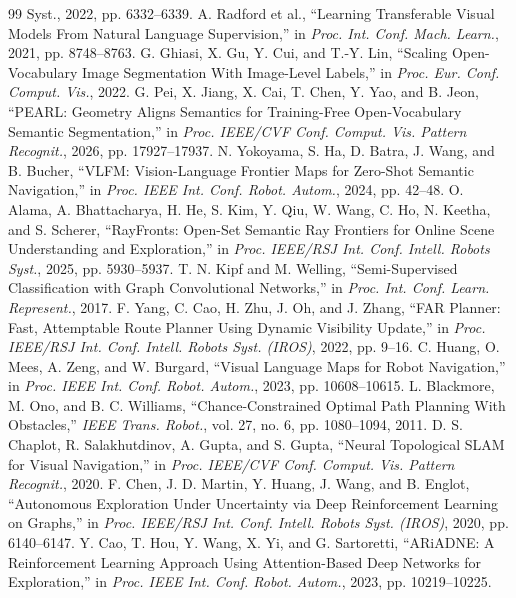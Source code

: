 \documentclass[letterpaper,10pt,conference]{ieeeconf}
\begin{document}
\begin{thebibliography}{99}
{Syst.}, 2022, pp. 6332--6339.
A. Radford et al.,
``Learning Transferable Visual Models From Natural Language Supervision,''
in \emph{Proc. Int. Conf. Mach. Learn.}, 2021, pp. 8748--8763.
G. Ghiasi, X. Gu, Y. Cui, and T.-Y. Lin,
``Scaling Open-Vocabulary Image Segmentation With Image-Level Labels,'' in
\emph{Proc. Eur. Conf. Comput. Vis.}, 2022.
G. Pei, X. Jiang, X. Cai, T. Chen, Y. Yao, and B. Jeon,
``PEARL: Geometry Aligns Semantics for Training-Free Open-Vocabulary Semantic
Segmentation,'' in \emph{Proc. IEEE/CVF Conf. Comput. Vis. Pattern Recognit.},
2026, pp. 17927--17937.
N. Yokoyama, S. Ha, D. Batra, J. Wang, and B. Bucher,
``VLFM: Vision-Language Frontier Maps for Zero-Shot Semantic Navigation,''
in \emph{Proc. IEEE Int. Conf. Robot. Autom.}, 2024, pp. 42--48.
O. Alama, A. Bhattacharya, H. He, S. Kim, Y. Qiu, W. Wang, C. Ho, N. Keetha,
and S. Scherer,
``RayFronts: Open-Set Semantic Ray Frontiers for Online Scene Understanding
and Exploration,'' in \emph{Proc. IEEE/RSJ Int. Conf. Intell. Robots Syst.},
2025, pp. 5930--5937.
T. N. Kipf and M. Welling,
``Semi-Supervised Classification with Graph Convolutional Networks,''
in \emph{Proc. Int. Conf. Learn. Represent.}, 2017.
F. Yang, C. Cao, H. Zhu, J. Oh, and J. Zhang,
``FAR Planner: Fast, Attemptable Route Planner Using Dynamic Visibility
Update,'' in \emph{Proc. IEEE/RSJ Int. Conf. Intell. Robots Syst.
(IROS)}, 2022, pp. 9--16.
C. Huang, O. Mees, A. Zeng, and W. Burgard,
``Visual Language Maps for Robot Navigation,'' in \emph{Proc. IEEE Int.
Conf. Robot. Autom.}, 2023, pp. 10608--10615.
L. Blackmore, M. Ono, and B. C. Williams,
``Chance-Constrained Optimal Path Planning With Obstacles,'' \emph{IEEE
Trans. Robot.}, vol. 27, no. 6, pp. 1080--1094, 2011.
D. S. Chaplot, R. Salakhutdinov, A. Gupta, and S. Gupta,
``Neural Topological SLAM for Visual Navigation,'' in \emph{Proc.
IEEE/CVF Conf. Comput. Vis. Pattern Recognit.}, 2020.
F. Chen, J. D. Martin, Y. Huang, J. Wang, and B. Englot,
``Autonomous Exploration Under Uncertainty via Deep Reinforcement
Learning on Graphs,'' in \emph{Proc. IEEE/RSJ Int. Conf. Intell.
Robots Syst. (IROS)}, 2020, pp. 6140--6147.
Y. Cao, T. Hou, Y. Wang, X. Yi, and G. Sartoretti,
``ARiADNE: A Reinforcement Learning Approach Using Attention-Based
Deep Networks for Exploration,'' in \emph{Proc. IEEE Int. Conf.
Robot. Autom.}, 2023, pp. 10219--10225.

\end{thebibliography}
\end{document}

